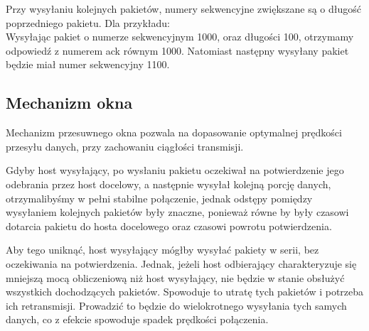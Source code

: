 			Przy wysyłaniu kolejnych pakietów, numery sekwencyjne zwiększane są o długość poprzedniego pakietu.
			Dla przykładu:\\
			Wysyłając pakiet o numerze sekwencyjnym 1000, oraz długości 100, otrzymamy odpowiedź z numerem ack równym 1000.
			Natomiast następny wysyłany pakiet będzie miał numer sekwencyjny 1100.
		\subsection{Mechanizm okna}
			Mechanizm przesuwnego okna pozwala na dopasowanie optymalnej prędkości przesyłu danych, przy zachowaniu ciągłości transmisji.

			Gdyby host wysyłający, po wysłaniu pakietu oczekiwał na potwierdzenie jego odebrania przez host docelowy, a następnie wysyłał kolejną porcję danych, otrzymalibyśmy w pełni stabilne połączenie, jednak odstępy pomiędzy wysyłaniem kolejnych pakietów były znaczne, ponieważ równe by były czasowi dotarcia pakietu do hosta docelowego oraz czasowi powrotu potwierdzenia.

			Aby tego uniknąć, host wysyłający mógłby wysyłać pakiety w serii, bez oczekiwania na potwierdzenia.
			Jednak, jeżeli host odbierający charakteryzuje się mniejszą mocą obliczeniową niż host wysyłający, nie będzie w stanie obsłużyć wszystkich dochodzących pakietów.
			Spowoduje to utratę tych pakietów i potrzeba ich retransmisji.
			Prowadzić to będzie do wielokrotnego wysyłania tych samych danych, co z efekcie spowoduje spadek prędkości połączenia.
		
